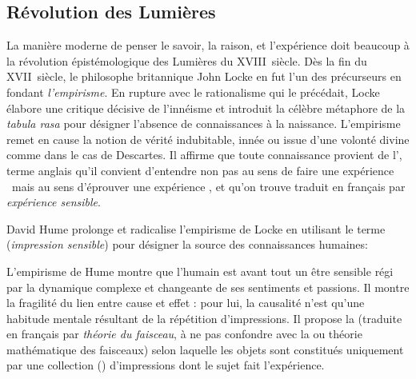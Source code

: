 \subsection{Révolution des Lumières}
\label{sec:lumieres}

\noindent
La manière moderne de penser le savoir, la raison, et l'expérience doit beaucoup à la révolution épistémologique des Lumières du XVIII\ieme{}~siècle.
Dès la fin du XVII\ieme{}~siècle, le philosophe britannique John Locke en fut l'un des précurseurs en fondant \emph{l'empirisme}. 
En rupture avec le rationalisme qui le précédait, Locke élabore une critique décisive de l'innéisme et introduit la célèbre métaphore de la \emph{tabula rasa} pour désigner l’absence de connaissances à la naissance.
L'empirisme remet en cause la notion de vérité indubitable, innée ou issue d'une volonté divine comme dans le cas de Descartes. 
Il affirme que toute connaissance provient de l', terme anglais qu'il convient d'entendre non pas au sens de \og faire une expérience \fg\ mais au sens \og d'éprouver une expérience \fg, et qu'on trouve traduit en français par \emph{expérience sensible}.

David Hume prolonge et radicalise l'empirisme de Locke en utilisant le terme  (\emph{impression sensible}) pour désigner la source des connaissances humaines: 

\begin{quote}
\cite{hume_treatise_1739}
\end{quote}

L'empirisme de Hume montre que l'humain est avant tout un être sensible régi par la dynamique complexe et changeante de ses sentiments et passions.  
Il montre la fragilité du lien entre cause et effet : pour lui, la causalité n’est qu’une habitude mentale résultant de la répétition d'impressions.
Il propose la  (traduite en français par \emph{théorie du faisceau}, à ne pas confondre avec la  ou théorie mathématique des faisceaux) selon laquelle les objets sont constitués uniquement par une collection () d'impressions dont le sujet fait l'expérience.  

